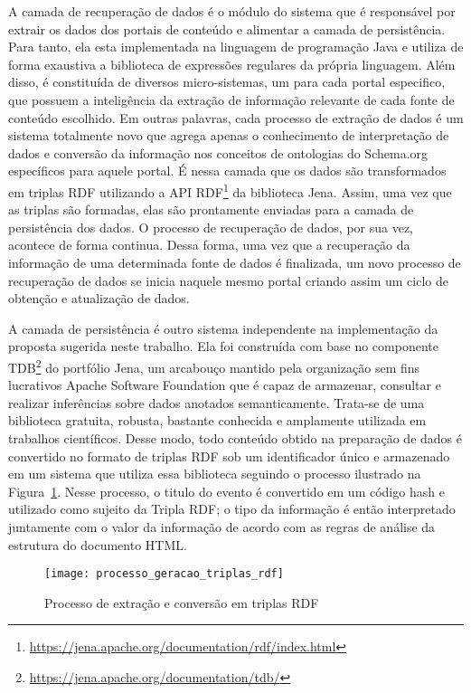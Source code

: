 A camada de recuperação de dados é o módulo do sistema que é responsável por extrair os dados dos portais de conteúdo e alimentar a camada de persistência. Para tanto, ela esta implementada na linguagem de programação Java e utiliza de forma exaustiva a biblioteca de expressões regulares da própria linguagem. Além disso, é constituída de diversos micro-sistemas, um para cada portal especifico, que possuem a inteligência da extração de informação relevante de cada fonte de conteúdo escolhido. Em outras palavras, cada processo de extração de dados  é um sistema totalmente novo que agrega apenas o conhecimento de interpretação de dados e conversão da informação nos conceitos de ontologias do Schema.org específicos para aquele portal. É nessa camada que os dados são transformados em triplas RDF utilizando a API RDF\footnote{\url{https://jena.apache.org/documentation/rdf/index.html}} da biblioteca Jena. Assim, uma vez que as triplas são formadas, elas são prontamente enviadas para a camada de persistência dos dados. O processo de recuperação de dados, por sua vez, acontece de forma continua. Dessa forma, uma vez que a recuperação da informação de uma determinada fonte de dados é finalizada, um novo processo de recuperação de dados se inicia naquele mesmo portal criando assim um ciclo de obtenção e atualização de dados. 

A camada de persistência é outro sistema independente na implementação da proposta sugerida neste trabalho. Ela foi construída com base no componente TDB\footnote{\url{https://jena.apache.org/documentation/tdb/}} do portfólio Jena, um arcabouço mantido pela organização sem fins lucrativos Apache Software Foundation que é capaz de armazenar, consultar e realizar inferências sobre dados anotados semanticamente. Trata-se de uma biblioteca gratuita, robusta, bastante conhecida e amplamente utilizada em trabalhos científicos. Desse modo, todo conteúdo obtido na preparação de dados é convertido no formato de triplas RDF sob um identificador único e armazenado em um sistema que utiliza essa biblioteca seguindo o processo ilustrado na Figura~\ref{fig:processo_geracao_triplas_rdf}. Nesse processo, o titulo do evento é convertido em um código hash e utilizado como sujeito da Tripla RDF; o tipo da informação é então interpretado juntamente com o valor da informação de acordo com as regras de análise da estrutura do documento HTML.

\begin{figure}[!ht]
  \centering
  \texttt{[image: processo\_geracao\_triplas\_rdf]} 
  \caption{Processo de extração e conversão em triplas RDF}
  \label{fig:processo_geracao_triplas_rdf} 
\end{figure}

